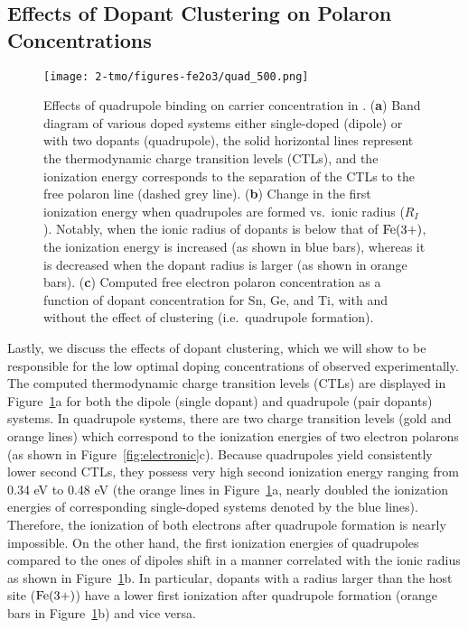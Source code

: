\subsection{Effects of Dopant Clustering on Polaron Concentrations}

\begin{figure}
    \centering
    \texttt{[image: 2-tmo/figures-fe2o3/quad\_500.png]}
    \caption{
    Effects of quadrupole binding on carrier concentration in .
    (\textbf{a}) Band diagram of various doped systems either single-doped (dipole) or with two dopants (quadrupole), the solid horizontal lines represent the thermodynamic charge transition levels (CTLs), and the ionization energy corresponds to the separation of the CTLs to the free polaron line (dashed grey line).
    (\textbf{b}) Change in the first ionization energy when quadrupoles are formed vs.\ ionic radius ($R_I$). Notably, when the ionic radius of dopants is below that of $\rm Fe (3+)$, the ionization energy is increased (as shown in blue bars), whereas it is decreased when the dopant radius is larger (as shown in orange bars).
    (\textbf{c}) Computed free electron polaron concentration as a function of dopant concentration for Sn, Ge, and Ti, with and without the effect of clustering (i.e.\ quadrupole formation).
    }
    \label{fig:quad}
\end{figure}

Lastly, we discuss the effects of dopant clustering, which we will show to be responsible for the low optimal doping concentrations of  observed experimentally.
The computed thermodynamic charge transition levels (CTLs) are displayed in Figure~\ref{fig:quad}a for both the dipole (single dopant) and quadrupole (pair dopants) systems. In quadrupole systems, there are two charge transition levels (gold and orange lines) which correspond to the ionization energies of two electron polarons (as shown in Figure~\ref{fig:electronic}c).
Because quadrupoles yield consistently lower second CTLs, they possess very high second ionization energy ranging from 0.34 eV to 0.48 eV (the orange lines in Figure~\ref{fig:quad}a, nearly doubled the ionization energies of corresponding single-doped systems denoted by the blue lines). Therefore, the ionization of both electrons after quadrupole formation is nearly impossible. On the other hand, the first ionization energies of quadrupoles compared to the ones of dipoles shift in a manner correlated with the ionic radius as shown in Figure~\ref{fig:quad}b.
In particular, dopants with a radius larger than the host site ($\rm Fe (3+)$) have a lower first ionization after quadrupole formation (orange bars in Figure~\ref{fig:quad}b) and vice versa.


